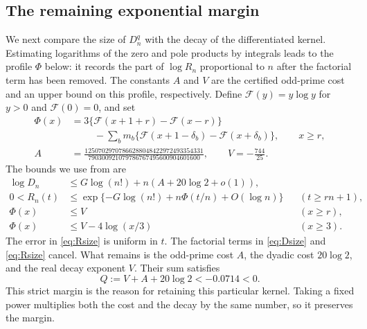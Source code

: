 \documentclass[11pt]{article}
\begin{document}
\subsection{The remaining exponential margin}
We next compare the size of $D_n^q$ with the decay of the differentiated
kernel. Estimating logarithms of the zero and pole products by integrals
leads to the profile $\Phi$ below: it records the part of $\log R_n$
proportional to $n$ after the factorial term has been removed. The
constants $A$ and $V$ are the certified odd-prime cost and an upper bound
on this profile, respectively. Define $\mathcal F(y)=y\log y$ for $y>0$
and $\mathcal F(0)=0$, and set
\begin{align*}
 \Phi(x)&=3\{\mathcal F(x+1+r)-\mathcal F(x-r)\}\\
 &\hspace{1cm}-\sum_bm_b\{\mathcal F(x+1-\delta_b)-\mathcal F(x+\delta_b)\},
                     \qquad x\ge r,\\
 A&=\frac{12507029707866288048422972493354331}
 {790300921079786767495600904601600},\qquad V=-\frac{744}{25}.
\end{align*}
The bounds we use from \cite[Corollary 5.9 and Propositions 6.4--6.5]{krisman}
are
\begin{align}
 \log D_n&\le G\log(n!)+n(A+20\log2+o(1)),\label{eq:Dsize}\\
 0<R_n(t)&\le\exp\{-G\log(n!)+n\Phi(t/n)+O(\log n)\}
                              &&(t\ge rn+1),\label{eq:Rsize}\\
 \Phi(x)&\le V&&(x\ge r),\label{eq:phase}\\
 \Phi(x)&\le V-4\log(x/3)&&(x\ge3).\label{eq:tail}
\end{align}
The error in \eqref{eq:Rsize} is uniform in $t$.
The factorial terms in \eqref{eq:Dsize} and \eqref{eq:Rsize} cancel.
What remains is the odd-prime cost $A$, the dyadic cost $20\log2$, and
the real decay exponent $V$. Their sum satisfies
\begin{equation}\label{eq:negative}
 Q:=V+A+20\log2<-0.0714<0.
\end{equation}
This strict margin is the reason for retaining this particular kernel.
Taking a fixed power multiplies both the cost and the decay by the same
number, so it preserves the margin.
\end{document}
